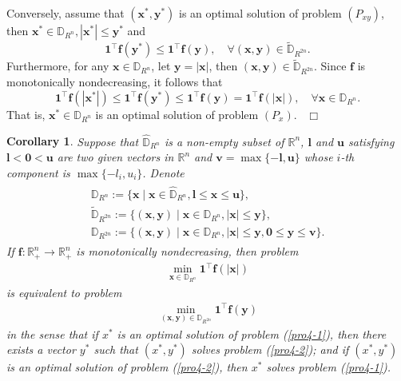 \documentclass[12pt]{article}
\newtheorem{Corollary}{Corollary}[part]
\def \ep{\hbox{ }\hfill$\Box$}
\begin{document}
Conversely, assume that $(\mathbf{x}^\ast,\mathbf{y}^\ast)$ is an optimal solution of problem $(P_{xy})$, then $\mathbf{x}^\ast\in\mathbb{D}_{R^{n}},|\mathbf{x}^\ast|\leqslant\mathbf{y}^\ast$ and
$$
\mathbf{1}^{\top}\mathbf{f}(\mathbf{y}^\ast)\leqslant\mathbf{1}^{\top}\mathbf{f}(\mathbf{y}), \quad \forall (\mathbf{x},\mathbf{y})\in \tilde{\mathbb{D}}_{R^{2n}}.
$$
Furthermore, for any $\mathbf{x}\in \mathbb{D}_{R^{n}}$, let $\mathbf{y}=|\mathbf{x}|$, then $(\mathbf{x},\mathbf{y})\in \tilde{\mathbb{D}}_{R^{2n}}$. Since $\mathbf{f}$ is monotonically nondecreasing, it follows that
$$
\mathbf{1}^{\top}\mathbf{f}(|\mathbf{x}^\ast|)\leqslant \mathbf{1}^{\top}\mathbf{f}(\mathbf{y}^\ast)\leqslant\mathbf{1}^{\top}\mathbf{f}(\mathbf{y}) =\mathbf{1}^{\top}\mathbf{f}(|\mathbf{x}|), \quad \forall \mathbf{x}\in \mathbb{D}_{R^{n}}.
$$
That is, $\mathbf{x}^\ast\in\mathbb{D}_{R^{n}}$ is an optimal solution of problem $(P_x)$.
\ep

\begin{Corollary}\label{add-cro1-1}
Suppose that $\hat{\mathbb{D}}_{R^n}$ is a non-empty subset of $\mathbb{R}^n$, $\mathbf{l}$ and $\mathbf{u}$ satisfying $\mathbf{l}<\mathbf{0}<\mathbf{u}$ are two given vectors in $\mathbb{R}^n$ and $\mathbf{v}=\max\{-\mathbf{l},\mathbf{u}\}$ whose $i$-th component is $\max\{-l_i,u_i\}$. Denote
\begin{eqnarray*}
\begin{array}{l}
\mathbb{D}_{R^{n}}:=\{\mathbf{x}\mid\mathbf{x}\in \hat{\mathbb{D}}_{R^n},\mathbf{l}\leqslant \mathbf{x}\leqslant \mathbf{u}\},\\
\tilde{\mathbb{D}}_{R^{2n}}:=\{(\mathbf{x}, \mathbf{y})\mid\mathbf{x}\in \mathbb{D}_{R^{n}}, |\mathbf{x}|\leqslant \mathbf{y}\},\\
\mathbb{D}_{R^{2n}}:=\{(\mathbf{x}, \mathbf{y})\mid\mathbf{x}\in \mathbb{D}_{R^{n}}, |\mathbf{x}|\leqslant \mathbf{y}, \mathbf{0}\leqslant \mathbf{y} \leqslant \mathbf{v}\}.
\end{array}
\end{eqnarray*}
If $\mathbf{f}: \mathbb{R}_+^{n}\rightarrow \mathbb{R}^{n}_{+}$  is monotonically nondecreasing, then problem
\begin{eqnarray}\label{pro4-1}
\min_{\mathbf{x}\in \mathbb{D}_{R^{n}}}\mathbf{1}^{\top}\mathbf{f}(|\mathbf{x}|)
\end{eqnarray}
is equivalent to problem
\begin{eqnarray}\label{pro4-2}
\min_{(\mathbf{x},\mathbf{y}) \in \mathbb{D}_{R^{2n}}}\mathbf{1}^{\top}\mathbf{f}(\mathbf{y})
\end{eqnarray}
in the sense that if $x^*$ is an optimal solution of problem (\ref{pro4-1}), then there exists a vector $y^*$ such that $(x^*,y^*)$ solves problem (\ref{pro4-2}); and if $(x^*,y^*)$ is an optimal solution of problem (\ref{pro4-2}), then $x^*$ solves problem (\ref{pro4-1}).
\end{Corollary}
\end{document}
